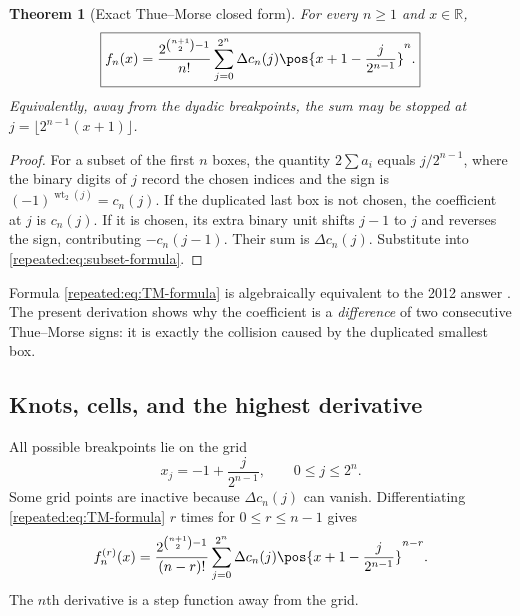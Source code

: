 \documentclass[11pt,oneside]{article}
\newtheorem{theorem}{Theorem}[section]
\theoremstyle{definition}
\theoremstyle{remark}
\newcommand{\R}{\mathbb R}
\newcommand{\wt}{\operatorname{wt}_2}
\begin{document}
\begin{theorem}[Exact Thue--Morse closed form]
\label{repeated:thm:TM-formula}
For every $n\ge1$ and $x\in\R$,
\begin{equation}
 \boxed{\displaystyle
 f_n(x)=\frac{2^{\binom{n+1}{2}-1}}{n!}
 \sum_{j=0}^{2^n}\Delta c_n(j)
 \pos{x+1-\frac{j}{2^{n-1}}}^{n}.}                         \label{repeated:eq:TM-formula}
\end{equation}
Equivalently, away from the dyadic breakpoints, the sum may be stopped at
$j=\lfloor2^{n-1}(x+1)\rfloor$.
\end{theorem}

\begin{proof}
For a subset of the first $n$ boxes, the quantity
$2\sum a_i$ equals $j/2^{n-1}$, where the binary digits of $j$ record the chosen indices and
the sign is $(-1)^{\wt(j)}=c_n(j)$.  If the duplicated last box is not chosen, the coefficient
at $j$ is $c_n(j)$.  If it is chosen, its extra binary unit shifts $j-1$ to $j$ and reverses
the sign, contributing $-c_n(j-1)$.  Their sum is $\Delta c_n(j)$.  Substitute into
\eqref{repeated:eq:subset-formula}.
\end{proof}

Formula \eqref{repeated:eq:TM-formula} is algebraically equivalent to the 2012 answer
\cite{repeated:mseanswer}.  The present derivation shows why the coefficient is a \emph{difference} of
two consecutive Thue--Morse signs: it is exactly the collision caused by the duplicated
smallest box.

\subsection{Knots, cells, and the highest derivative}

All possible breakpoints lie on the grid
\begin{equation}
 x_j=-1+\frac{j}{2^{n-1}},\qquad 0\le j\le2^n.             \label{repeated:eq:knot-grid}
\end{equation}
Some grid points are inactive because $\Delta c_n(j)$ can vanish.  Differentiating
\eqref{repeated:eq:TM-formula} $r$ times for $0\le r\le n-1$ gives
\begin{equation}
 f_n^{(r)}(x)=
 \frac{2^{\binom{n+1}{2}-1}}{(n-r)!}
 \sum_{j=0}^{2^n}\Delta c_n(j)
 \pos{x+1-\frac{j}{2^{n-1}}}^{n-r}.                        \label{repeated:eq:TM-derivatives}
\end{equation}
The $n$th derivative is a step function away from the grid.
\end{document}
